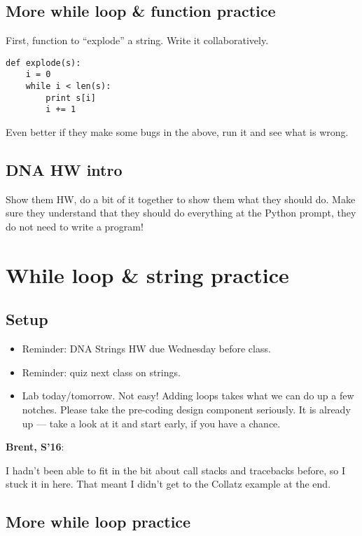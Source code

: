 \documentclass{article}
\newenvironment{reflect}[1]
{
  \noindent
  \begin{lrbox}{\reflectbox}
    \begin{minipage}[t]{\textwidth}
      \textbf{#1}:
}{
    \end{minipage}
  \end{lrbox}
  \fbox{\usebox{\reflectbox}}
}
\begin{document}
\subsection*{More while loop \& function practice}

First, function to ``explode'' a string.  Write it collaboratively.

\begin{verbatim}
def explode(s):
    i = 0
    while i < len(s):
        print s[i]
        i += 1
\end{verbatim}

Even better if they make some bugs in the above, run it and see what
is wrong.

\subsection*{DNA HW intro}

Show them HW, do a bit of it together to show them what they should
do.  Make sure they understand that they should do everything at the
Python prompt, they do not need to write a program!

\newpage

\section{While loop \& string practice}

\subsection*{Setup}
\begin{itemize}
\item Reminder: DNA Strings HW due Wednesday before class.
\item Reminder: quiz next class on strings.
\item Lab today/tomorrow.  Not easy!  Adding loops takes what we can
  do up a few notches.  Please take the pre-coding design component
  seriously.  It is already up --- take a look at it and start early,
  if you have a chance.
\end{itemize}

\begin{reflect}{Brent, S'16}
  I hadn't been able to fit in the bit about call stacks and
  tracebacks before, so I stuck it in here.  That meant I didn't get
  to the Collatz example at the end.
\end{reflect}

\subsection*{More while loop practice}
\end{document}
